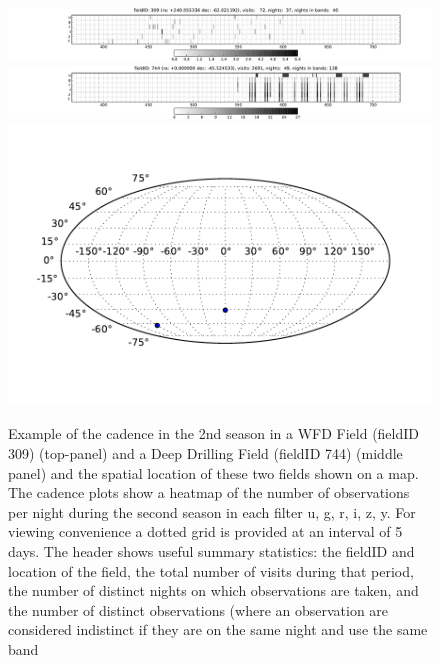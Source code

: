 \begin{figure}
 \centering
 \includegraphics[width=\textwidth]{figs/supernova/fig_309_2ndYear}
 \includegraphics[width=\textwidth]{figs/supernova/fig_744_2ndYear}
 \includegraphics[height=0.2\textheight]{figs/supernova/loc_309_744.pdf}
 \label{fig:SN_sampling}
 \caption{Example of the cadence in the 2nd season in a WFD Field (fieldID 309) (top-panel) and a Deep Drilling Field (fieldID 744) (middle panel) and the
     spatial location of these two fields shown on a map. The cadence plots show a heatmap of the number of observations per night during the second season in each filter u, g, r, i, z, y. For viewing convenience a dotted grid is provided at an interval of 5 days. The header shows useful summary statistics:
 the fieldID and location of the field, the total number of visits during that period, the number of distinct nights on 
 which observations are taken, and the number of distinct observations (where an observation are considered indistinct 
 if they are on the same night and use the same band}
\end{figure}


